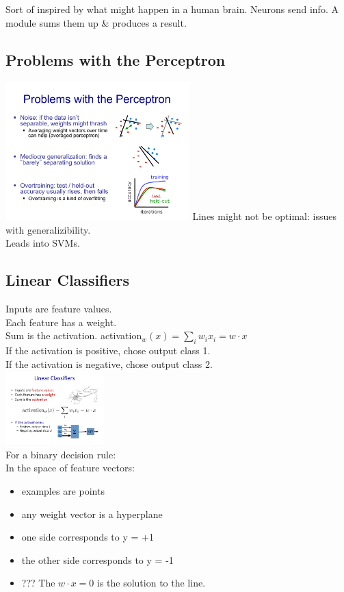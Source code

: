 Sort of inspired by what might happen in a human brain.
Neurons send info.  A module sums them up \& produces a result. 


\subsection{Problems with the Perceptron}
\includegraphics[width=2.8in]{figures/perceptron_problems.pdf}
Lines might not be optimal: issues with generalizibility. \hfill \\
Leads into SVMs. \hfill \\

 \subsection{Linear Classifiers}
 Inputs are feature values.  \hfill \\
 Each feature has a weight.  \hfill \\
 Sum is the activation.  activation$_w(x) = \sum_i w_i x_i = w \cdot x$  \hfill \\
 If the activation is positive, chose output class 1.  \hfill \\
 If the activation is negative, chose output class 2.  \hfill \\
 
 \includegraphics[width=1.5in]{figures/linear_classifier_cartoon.pdf}  \hfill \\
 
 For a binary decision rule:   \hfill \\
 In the space of feature vectors: 
 \begin{itemize}
 	\item examples are points
	\item any weight vector is a hyperplane
	\item one side corresponds to y = +1
	\item the other side corresponds to y = -1
	\item ??? The $w \cdot x = 0$ is the solution to the line.
 \end{itemize}
 

